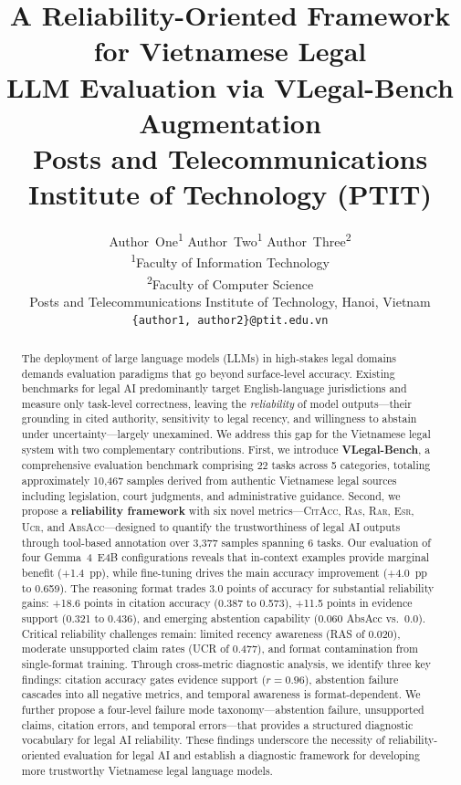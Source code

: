 \documentclass[11pt,a4paper]{article}
\title{%
    \vspace{-1cm}
    \textbf{A Reliability-Oriented Framework for Vietnamese Legal\\
    LLM Evaluation via VLegal-Bench Augmentation}\\[6pt]
    \large Posts and Telecommunications Institute of Technology (PTIT)
}
\author{%
    Author~One\textsuperscript{1} \quad
    Author~Two\textsuperscript{1} \quad
    Author~Three\textsuperscript{2}\\[4pt]
    \textsuperscript{1}Faculty of Information Technology\\
    \textsuperscript{2}Faculty of Computer Science\\
    Posts and Telecommunications Institute of Technology, Hanoi, Vietnam\\
    \texttt{\{author1, author2\}@ptit.edu.vn}
}
\date{}
\newcommand{\system}{VLegal-Bench}
\newcommand{\model}{Gemma~4~E4B}
\newcommand{\citacc}{\textsc{CitAcc}}
\newcommand{\ras}{\textsc{Ras}}
\newcommand{\rar}{\textsc{Rar}}
\newcommand{\esr}{\textsc{Esr}}
\newcommand{\ucr}{\textsc{Ucr}}
\newcommand{\absacc}{\textsc{AbsAcc}}
\begin{document}
\maketitle

\begin{abstract}
The deployment of large language models (LLMs) in high-stakes legal domains demands evaluation paradigms that go beyond surface-level accuracy.
Existing benchmarks for legal AI predominantly target English-language jurisdictions and measure only task-level correctness, leaving the \emph{reliability} of model outputs---their grounding in cited authority, sensitivity to legal recency, and willingness to abstain under uncertainty---largely unexamined.
We address this gap for the Vietnamese legal system with two complementary contributions.
First, we introduce \textbf{\system}, a comprehensive evaluation benchmark comprising 22 tasks across 5 categories, totaling approximately 10{,}467 samples derived from authentic Vietnamese legal sources including legislation, court judgments, and administrative guidance.
Second, we propose a \textbf{reliability framework} with six novel metrics---\citacc, \ras, \rar, \esr, \ucr, and \absacc---designed to quantify the trustworthiness of legal AI outputs through tool-based annotation over 3{,}377 samples spanning 6 tasks.
Our evaluation of four \model{} configurations reveals that in-context examples provide marginal benefit (+1.4~pp), while fine-tuning drives the main accuracy improvement (+4.0~pp to 0.659). The reasoning format trades 3.0 points of accuracy for substantial reliability gains: +18.6 points in citation accuracy (0.387 to 0.573), +11.5 points in evidence support (0.321 to 0.436), and emerging abstention capability (0.060 AbsAcc vs.\ 0.0).
Critical reliability challenges remain: limited recency awareness (RAS of 0.020), moderate unsupported claim rates (UCR of 0.477), and format contamination from single-format training.
Through cross-metric diagnostic analysis, we identify three key findings: citation accuracy gates evidence support ($r = 0.96$), abstention failure cascades into all negative metrics, and temporal awareness is format-dependent.
We further propose a four-level failure mode taxonomy---abstention failure, unsupported claims, citation errors, and temporal errors---that provides a structured diagnostic vocabulary for legal AI reliability.
These findings underscore the necessity of reliability-oriented evaluation for legal AI and establish a diagnostic framework for developing more trustworthy Vietnamese legal language models.
\end{abstract}
\end{document}
